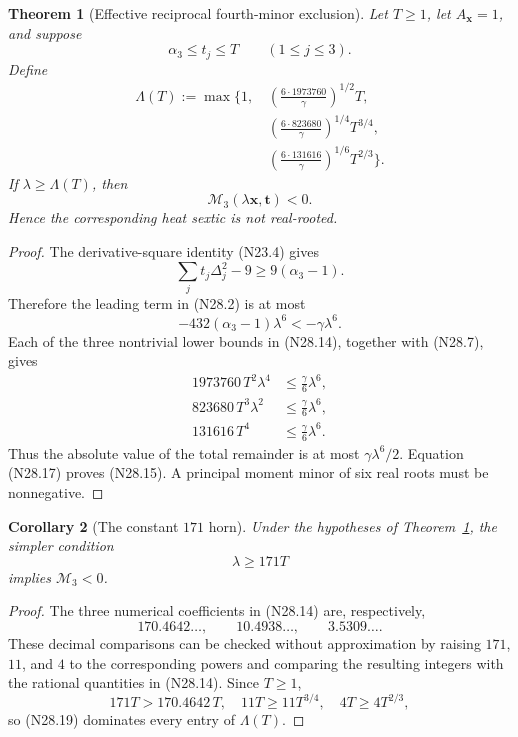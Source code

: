 \documentclass[11pt]{article}
\newtheorem{theorem}{Theorem}[section]
\newtheorem{corollary}[theorem]{Corollary}
\theoremstyle{definition}
\theoremstyle{remark}
\begin{document}
\begin{theorem}[Effective reciprocal fourth-minor exclusion]
\label{thm:f2v28-effective}
Let \(T\geq1\), let \(A_{\bm x}=1\), and suppose
\[
 \alpha_3\leq t_j\leq T\qquad(1\leq j\leq3).
 \tag{N28.13}
\]
Define
\[
\begin{aligned}
 \Lambda(T):=\max\Bigg\{1,\,
 &\left(\frac{6\cdot1973760}{\gamma}\right)^{1/2}T,\\
 &\left(\frac{6\cdot823680}{\gamma}\right)^{1/4}T^{3/4},\\
 &\left(\frac{6\cdot131616}{\gamma}\right)^{1/6}T^{2/3}
 \Bigg\}.
\end{aligned}
\tag{N28.14}
\]
If \(\lambda\geq\Lambda(T)\), then
\[
 \mathcal M_3(\lambda\bm x,\bm t)<0.
 \tag{N28.15}
\]
Hence the corresponding heat sextic is not real-rooted.
\end{theorem}

\begin{proof}
The derivative-square identity \textup{(N23.4)} gives
\[
 \sum_jt_j\Delta_j^2-9
 \geq9(\alpha_3-1).
 \tag{N28.16}
\]
Therefore the leading term in \textup{(N28.2)} is at most
\[
 -432(\alpha_3-1)\lambda^6<-\gamma\lambda^6.
 \tag{N28.17}
\]
Each of the three nontrivial lower bounds in
\textup{(N28.14)}, together with \textup{(N28.7)}, gives
\[
\begin{aligned}
 1973760\,T^2\lambda^4&\leq\frac{\gamma}{6}\lambda^6,\\
 823680\,T^3\lambda^2&\leq\frac{\gamma}{6}\lambda^6,\\
 131616\,T^4&\leq\frac{\gamma}{6}\lambda^6.
\end{aligned}
\tag{N28.18}
\]
Thus the absolute value of the total remainder is at most
\(\gamma\lambda^6/2\).  Equation \textup{(N28.17)} proves
\textup{(N28.15)}.  A principal moment minor of six real roots must be
nonnegative.
\end{proof}

\begin{corollary}[The constant \(171\) horn]
\label{cor:f2v28-171}
Under the hypotheses of
Theorem~\ref{thm:f2v28-effective}, the simpler condition
\[
 \lambda\geq171T
 \tag{N28.19}
\]
implies \(\mathcal M_3<0\).
\end{corollary}

\begin{proof}
The three numerical coefficients in \textup{(N28.14)} are, respectively,
\[
 170.4642\ldots,\qquad
 10.4938\ldots,\qquad
 3.5309\ldots.
 \tag{N28.20}
\]
These decimal comparisons can be checked without approximation by raising
\(171\), \(11\), and \(4\) to the corresponding powers and comparing the
resulting integers with the rational quantities in
\textup{(N28.14)}.  Since \(T\geq1\),
\[
 171T>
 170.4642\,T,\quad
 11T\geq11T^{3/4},\quad
 4T\geq4T^{2/3},
 \tag{N28.21}
\]
so \textup{(N28.19)} dominates every entry of
\(\Lambda(T)\).
\end{proof}
\end{document}
